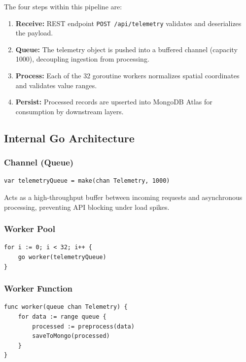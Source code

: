 \documentclass[11pt, a4paper]{article}
\newcommand{\tech}[1]{\texttt{\textcolor{headingblue}{#1}}}
\begin{document}
The four steps within this pipeline are:

\begin{enumerate}[leftmargin=1.5cm]
  \item \textbf{Receive:} REST endpoint \tech{POST /api/telemetry} validates and deserializes the payload.
  \item \textbf{Queue:} The telemetry object is pushed into a buffered channel (capacity 1000), decoupling ingestion from processing.
  \item \textbf{Process:} Each of the 32 goroutine workers normalizes spatial coordinates and validates value ranges.
  \item \textbf{Persist:} Processed records are upserted into MongoDB Atlas for consumption by downstream layers.
\end{enumerate}

\subsection{Internal Go Architecture}

\subsubsection{Channel (Queue)}

\begin{lstlisting}[style=gostyle, caption={Buffered Telemetry Channel}]
var telemetryQueue = make(chan Telemetry, 1000)
\end{lstlisting}

Acts as a high-throughput buffer between incoming requests and asynchronous processing,
preventing API blocking under load spikes.

\subsubsection{Worker Pool}

\begin{lstlisting}[style=gostyle, caption={32-Worker Goroutine Pool}]
for i := 0; i < 32; i++ {
    go worker(telemetryQueue)
}
\end{lstlisting}

\subsubsection{Worker Function}

\begin{lstlisting}[style=gostyle, caption={Worker Processing Loop}]
func worker(queue chan Telemetry) {
    for data := range queue {
        processed := preprocess(data)
        saveToMongo(processed)
    }
}
\end{lstlisting}
\end{document}
